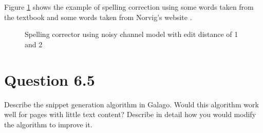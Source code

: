 \documentclass[letterpaper,11pt]{article}
\begin{document}
Figure \ref{fig:spelling_corrector} shows the example of spelling correction using some words taken from the textbook \cite{Croft:2009:SEI:1516224} and some words taken from Norvig's website \cite{norvig}. 

\begin{figure}[H]
	\centering
	\caption{Spelling corrector using noisy channel model with edit distance of 1 and 2}
	\label{fig:spelling_corrector}
\end{figure}

\noindent\makebox[\linewidth]{\rule{\textwidth}{0.4pt}}

\section*{Question 6.5}
\begin{spverbatim}
Describe the snippet generation algorithm in Galago. Would this algorithm work well for pages with little text content? Describe in detail how you would modify the algorithm to improve it.
\end{spverbatim}
\end{document}
